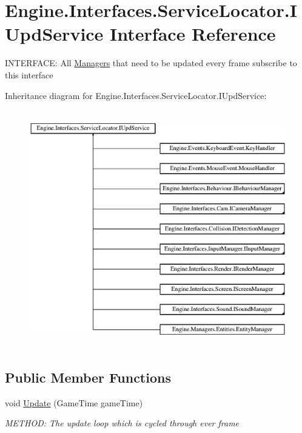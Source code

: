 \hypertarget{a00478}{}\section{Engine.\+Interfaces.\+Service\+Locator.\+I\+Upd\+Service Interface Reference}
\label{a00478}


I\+N\+T\+E\+R\+F\+A\+CE\+: All \hyperlink{a00239}{Managers} that need to be updated every frame subscribe to this interface  


Inheritance diagram for Engine.\+Interfaces.\+Service\+Locator.\+I\+Upd\+Service\+:\begin{figure}[H]
\begin{center}
\leavevmode
\includegraphics[height=10.370371cm]{d9/dea/a00478}
\end{center}
\end{figure}
\subsection*{Public Member Functions}
\begin{DoxyCompactItemize}
\item 
void \hyperlink{a00478_a387fce2a5440a4dc63f8d72772ecbdaa}{Update} (Game\+Time game\+Time)
\begin{DoxyCompactList}\small\item\em M\+E\+T\+H\+OD\+: The update loop which is cycled through ever frame \end{DoxyCompactList}\end{DoxyCompactItemize}


